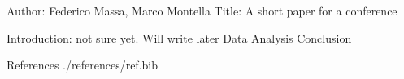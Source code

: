 
Author: Federico Massa, Marco Montella
Title: A short paper for a conference

Introduction: not sure yet. Will write later
Data
Analysis
Conclusion

References
./references/ref.bib
